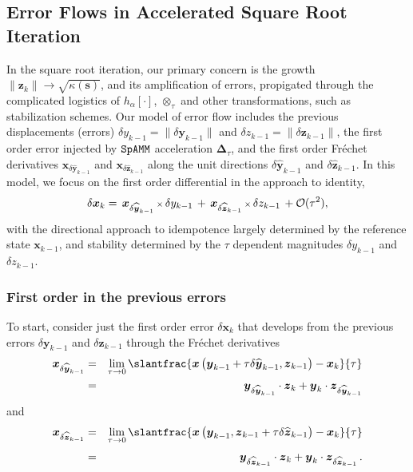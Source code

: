 \documentclass[letterpaper,twocolumn,amsmath,amsfont,amssymb,english,aps,jcp,preprintnumbers,groupaddress,nofootinbib,tightenlines]{revtex4}
\newcommand{\mat}[1]{\boldsymbol{#1}}
\newcommand{\ot}{ {\scriptstyle \otimes}_{ \tau } }
\begin{document}
\pagebreak

\subsection{Error Flows in Accelerated Square Root Iteration}

In the square root iteration, our primary concern is the growth 
$\lVert \mat{z}_{k} \rVert  \rightarrow \sqrt{\kappa\left(\mat{s} \right)}$, 
and its amplification of errors, propigated through the complicated logistics of $h_\alpha[\cdot]$,  
$\ot$ and other transformations, such as stabilization schemes.   Our model of error flow
includes the previous displacements (errors) $\delta y_{k-1} = \lVert \delta \mat{y}_{k-1} \rVert$  and  $\delta z_{k-1}=\lVert \delta \mat{z}_{k-1} \rVert$,
the first order error injected by $\tt SpAMM$ acceleration $\mat{\Delta}_\tau$,  and the first order
Fr\'{e}chet derivatives \cite{} ${\mat{x}}_{\delta \widehat{\mat{y}}_{k-1}}$ and ${\mat{x}}_{\delta \widehat{ \mat{z}}_{k-1}}$ 
along the unit directions  $\delta \widehat{\mat{y}}_{k-1}$ and $\delta \widehat{\mat{z}}_{k-1}$.
In this model, we focus on the first order differential in the approach to identity, 
\begin{equation} \label{firstorder}
\delta \mat{x}_k = \,  { \mat{x}}_{\delta \widehat{\mat{y}}_{k-1}}  \, {\scriptstyle \times} \, \delta y_{k-1} 
                 \, + \,  { \mat{x}}_{\delta \widehat{\mat{z}}_{k-1}}  \, {\scriptstyle \times} \, \delta z_{k-1}  \, + {\cal O}(\tau^2) ,
\end{equation}
with the directional approach to idempotence largely determined by the reference state $\mat{x}_{k-1}$, and stability determined by
the $\tau$ dependent magnitudes $\delta y_{k-1}$  and $\delta z_{k-1}$. 
 
\subsubsection{First order in the previous errors}

To start, consider just the first order error $\delta \mat{x}_k$ that develops from the previous errors $\delta \mat{y}_{k-1}$
and $\delta \mat{z}_{k-1}$ through the Fr\'{e}chet derivatives \cite{}
\begin{eqnarray}
  \mat{x}_{\delta \widehat{ \mat{y}}_{k-1}} 
&=& \lim_{\tau \rightarrow 0} \slantfrac{ \mat{x} \left( \mat{y}_{k-1} + \tau \delta \widehat{\mat{y}}_{k-1} ,  {\mat{z}}_{k-1}  \right)
                                     -\mat{x}_k    }{\tau}  \nonumber  \\
&=&   \mat{y}_{\delta \widehat{ \mat{y}}_{k-1}} \cdot \mat{z}_{k}  + \mat{y}_{k}  \cdot \mat{z}_{\delta \widehat{ \mat{y}}_{k-1}} 
 \end{eqnarray}
and 
 \begin{eqnarray}
 \mat{x}_{\delta \widehat{ \mat{z}}_{k-1}} &=& \lim_{\tau \rightarrow 0} 
\slantfrac{ \mat{x} \left( {\mat{y}}_{k-1} , \mat{z}_{k-1} +\tau  \delta \widehat{\mat{z}}_{k-1} \right) - \mat{x}_k   }{\tau} \nonumber  \\[0.1cm] 
&=& \mat{y}_{\delta \widehat{ \mat{z}}_{k-1}} \cdot \mat{z}_{k}  + \mat{y}_{k}  \cdot \mat{z}_{\delta \widehat{ \mat{z}}_{k-1}} \, . 
 \end{eqnarray}
\end{document}
